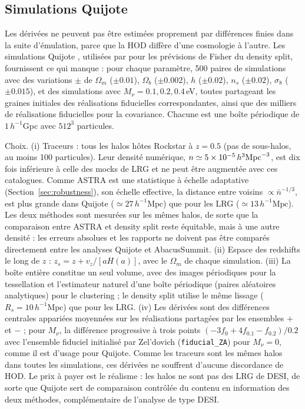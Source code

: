 \documentclass[11pt,twocolumn]{article}
\newcommand{\Mpch}{\,h^{-1}\mathrm{Mpc}}
\begin{document}
\subsection{Simulations Quijote}
\label{sec:quijote_sims}

Les dérivées ne peuvent pas être estimées proprement par différences finies dans la suite d'émulation, parce que la HOD diffère d'une cosmologie à l'autre. Les simulations Quijote \cite{Quijote}, utilisées par \cite{Paillas2023} pour les prévisions de Fisher du density split, fournissent ce qui manque : pour chaque paramètre, 500 paires de simulations avec des variations $\pm$ de $\Omega_m$ ($\pm0.01$), $\Omega_b$ ($\pm0.002$), $h$ ($\pm0.02$), $n_s$ ($\pm0.02$), $\sigma_8$ ($\pm0.015$), et des simulations avec $M_\nu = 0.1, 0.2, 0.4$\,eV, toutes partageant les graines initiales des réalisations fiducielles correspondantes, ainsi que des milliers de réalisations fiducielles pour la covariance. Chacune est une boîte périodique de $1\,h^{-1}$Gpc avec $512^3$ particules.

Choix. (i) Traceurs : tous les halos hôtes Rockstar à $z=0.5$ (pas de sous-halos, au moins 100 particules). Leur densité numérique, $n\simeq5\times10^{-5}\,h^3{\rm Mpc}^{-3}$, est dix fois inférieure à celle des mocks de LRG et ne peut être augmentée avec ces catalogues. Comme ASTRA est une statistique à échelle adaptative (Section~\ref{sec:robustness}), son échelle effective, la distance entre voisins $\propto\bar n^{-1/3}$, est plus grande dans Quijote ($\simeq27\Mpch$) que pour les LRG ($\simeq13\Mpch$). Les deux méthodes sont mesurées sur les mêmes halos, de sorte que la comparaison entre ASTRA et density split reste équitable, mais à une autre densité : les erreurs absolues et les rapports ne doivent pas être comparés directement entre les analyses Quijote et AbacusSummit. (ii) Espace des redshifts le long de $z$ : $z_s = z + v_z/[aH(a)]$, avec le $\Omega_m$ de chaque simulation. (iii) La boîte entière constitue un seul volume, avec des images périodiques pour la tessellation et l'estimateur naturel d'une boîte périodique (paires aléatoires analytiques) pour le clustering ; le density split utilise le même lissage ($R_s=10\Mpch$) que pour les LRG. (iv) Les dérivées sont des différences centrales appariées moyennées sur les réalisations partagées par les ensembles $+$ et $-$ ; pour $M_\nu$, la différence progressive à trois points $(-3f_0+4f_{0.1}-f_{0.2})/0.2$ avec l'ensemble fiduciel initialisé par Zel'dovich (\texttt{fiducial\_ZA}) pour $M_\nu=0$, comme il est d'usage pour Quijote. Comme les traceurs sont les mêmes halos dans toutes les simulations, ces dérivées ne souffrent d'aucune discordance de HOD. Le prix à payer est le réalisme : les halos ne sont pas des LRG de DESI, de sorte que Quijote sert de comparaison contrôlée du contenu en information des deux méthodes, complémentaire de l'analyse de type DESI.
\end{document}
